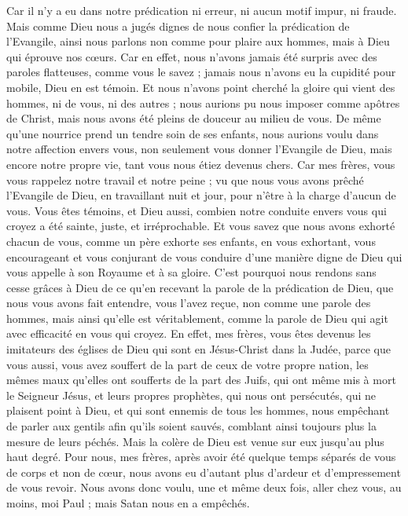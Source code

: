 \begin{multicols}{2}
Car il n’y a eu dans notre prédication ni erreur, ni aucun motif impur, ni fraude.
Mais comme Dieu nous a jugés dignes de nous confier la prédication de l'Evangile, ainsi nous parlons non comme pour plaire aux hommes, mais à Dieu qui éprouve nos cœurs.
Car en effet, nous n’avons jamais été surpris avec des paroles flatteuses, comme vous le savez ; jamais nous n’avons eu la cupidité pour mobile, Dieu en est témoin.
Et nous n'avons point cherché la gloire qui vient des hommes, ni de vous, ni des autres ; nous aurions pu nous imposer comme apôtres de Christ,
mais nous avons été pleins de douceur au milieu de vous. De même qu’une nourrice prend un tendre soin de ses enfants,
nous aurions voulu dans notre affection envers vous, non seulement vous donner l’Evangile de Dieu, mais encore notre propre vie, tant vous nous étiez devenus chers.
Car mes frères, vous vous rappelez notre travail et notre peine ; vu que nous vous avons prêché l'Evangile de Dieu, en travaillant nuit et jour, pour n'être à la charge d’aucun de vous.
Vous êtes témoins, et Dieu aussi, combien notre conduite envers vous qui croyez a été sainte, juste, et irréprochable.
Et vous savez que nous avons exhorté chacun de vous, comme un père exhorte ses enfants,
en vous exhortant, vous encourageant et vous conjurant de vous conduire d’une manière digne de Dieu qui vous appelle à son Royaume et à sa gloire.
C'est pourquoi nous rendons sans cesse grâces à Dieu de ce qu’en recevant la parole de la prédication de Dieu, que nous vous avons fait entendre, vous l'avez reçue, non comme une parole des hommes, mais ainsi qu'elle est véritablement, comme la parole de Dieu qui agit avec efficacité en vous qui croyez.
En effet, mes frères, vous êtes devenus les imitateurs des églises de Dieu qui sont en Jésus-Christ dans la Judée, parce que vous aussi, vous avez souffert de la part de ceux de votre propre nation, les mêmes maux qu’elles ont soufferts de la part des Juifs,
qui ont même mis à mort le Seigneur Jésus, et leurs propres prophètes, qui nous ont persécutés, qui ne plaisent point à Dieu, et qui sont ennemis de tous les hommes,
nous empêchant de parler aux gentils afin qu'ils soient sauvés, comblant ainsi toujours plus la mesure de leurs péchés. Mais la colère de Dieu est venue sur eux jusqu'au plus haut degré.
Pour nous, mes frères, après avoir été quelque temps séparés de vous de corps et non de cœur, nous avons eu d’autant plus d’ardeur et d’empressement de vous revoir.
Nous avons donc voulu, une et même deux fois, aller chez vous, au moins, moi Paul ; mais Satan nous en a empêchés.

\end{multicols}
